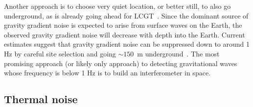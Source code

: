 \documentclass{article}
\begin{document}
Another approach is to choose very quiet location, or better still, to also go
underground, as is already going ahead for LCGT~\cite{Miyoki:2005}.  Since the
dominant source of gravity gradient noise is expected to arise from surface
waves on the Earth, the observed gravity gradient noise will decrease with depth
into the Earth.  Current estimates suggest that gravity gradient noise can be
suppressed down to around 1 Hz by careful site selection and going $\sim 150$~m
underground~\cite{Beker:2011}.  The most promising approach (or likely only
approach) to detecting gravitational waves whose frequency is below 1 Hz is to
build an interferometer in space.


\subsection{Thermal noise}
\label{subsection:thermal}
\end{document}
